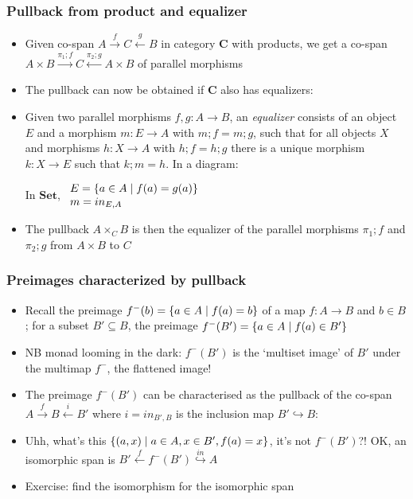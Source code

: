 \documentclass[handout]{beamer}
\newcommand{\bfsf}[1]{{\boldsymbol{#1}}}
\newcommand{\Set}{\bfsf{Set}}
\newcommand{\CC}{\bfsf{C}}
\begin{document}
\frame
  {   
    \frametitle{Pullback from product and equalizer}\label{Ch4:PullbProdEq}

 \begin{itemize}[<+->]
\item Given co-span $A\stackrel{f}{\to} C\stackrel{g}{\leftarrow}B$ in 
category $\CC$ with products, we get a co-span
$A\times B\stackrel{\pi_1;f}{\to} C\stackrel{\pi_2;g}{\leftarrow}A\times B$
of parallel morphisms
\item The pullback can now be obtained if $\CC$ also has equalizers:
\item Given two parallel morphisms $f,g: A\to B$, an \emph{equalizer}
consists of an object $E$ and a morphism $m:E\to A$ with $m;f=m;g$,
such that for all objects $X$ and morphisms $h:X\to A$ with $h;f=h;g$
there is a unique morphism $k: X\to E$ such that $k;m = h$. In a diagram:
In $\Set$, %
$\begin{array}{ll}E=\{a\in A\mid f(a)=g(a)\}\\m=in_{E,A}\end{array}$
\item The pullback $A\times_C B$ is then the equalizer of the parallel
morphisms $\pi_1;f$ and $\pi_2;g$ from $A\times B$ to $C$
 \end{itemize}

 }

\frame
  {   
    \frametitle{Preimages characterized by pullback}\label{Ch4:PullbPreim}

 \begin{itemize}[<+->]
\item Recall the preimage $f^-(b) = \{a\in A \mid f(a)=b\}$ of a map 
$f:A\to B$ and $b\in B$; for  a subset $B'\subseteq B$, 
the preimage $f^-(B') = \{a\in A \mid f(a)\in B'\}$ 
\item {\color{red} NB monad looming in the dark: $f^-(B')$ is the
`multiset image' of $B'$ under the multimap $f^-$, the flattened image!}
\item The preimage $f^-(B')$ can be characterised  as the pullback of the 
co-span $A\stackrel{f}{\to} B\stackrel{i}{\leftarrow}B'$ where $i=in_{B',B}$
is the inclusion map $B'\hookrightarrow B$:
\item Uhh, what's this $\{(a,x) \mid a\in A, x\in B', f(a)=x\}$, it's not $f^-(B')$?! OK,
an isomorphic span is $B'\stackrel{f}{\leftarrow} f^-(B') \stackrel{in}{\hookrightarrow}A$
\item Exercise: find the isomorphism for the isomorphic span
 \end{itemize}

 }
\end{document}
